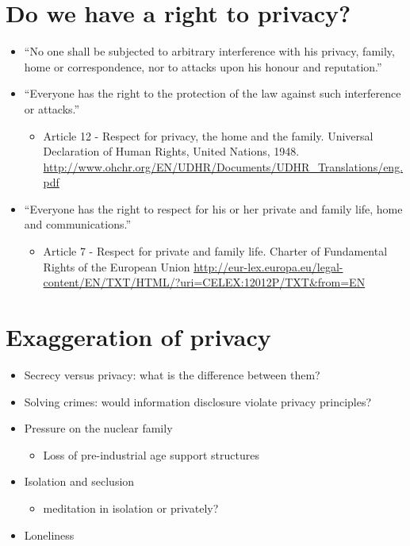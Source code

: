 \documentclass{article}
\begin{document}
\section{Do we have a right to privacy?}
\begin{itemize}
\item ``No one shall be subjected to arbitrary interference with his privacy, family, home or correspondence, nor to attacks upon his honour and reputation.''
\item ``Everyone has the right to the protection of the law against such interference or attacks.''
\begin{itemize}
\item Article 12 - Respect for privacy, the home and the family. Universal Declaration of Human Rights, United Nations, 1948. \url{http://www.ohchr.org/EN/UDHR/Documents/UDHR_Translations/eng.pdf}
\end{itemize}
\item ``Everyone has the right to respect for his or her private and family life, home and communications.''
\begin{itemize}
\item Article 7 - Respect for private and family life. Charter of Fundamental Rights of the European Union \url{http://eur-lex.europa.eu/legal-content/EN/TXT/HTML/?uri=CELEX:12012P/TXT&from=EN}
\end{itemize}
\end{itemize}



\section{Exaggeration of privacy}
\begin{itemize}
\item Secrecy versus privacy: what is the difference between them? 
\item Solving crimes: would information disclosure violate privacy principles?
\item Pressure on the nuclear family
\begin{itemize}
\item Loss of pre-industrial age support structures
\end{itemize}
\item Isolation and seclusion
\begin{itemize}
\item meditation in isolation or privately?
\end{itemize}
\item Loneliness
\end{itemize}
\end{document}
